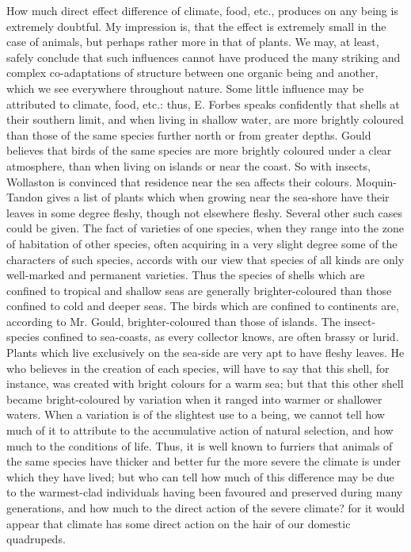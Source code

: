 How much direct effect difference of climate, food, etc., produces on any being is extremely doubtful. My impression is, that the effect is extremely small in the case of animals, but perhaps rather more in that of plants. We may, at least, safely conclude that such influences cannot have produced the many striking and complex co-adaptations of structure between one organic being and another, which we see everywhere throughout nature. Some little influence may be attributed to climate, food, etc.: thus, E. Forbes speaks confidently that shells at their southern limit, and when living in shallow water, are more brightly coloured than those of the same species further north or from greater depths. Gould believes that birds of the same species are more brightly coloured under a clear atmosphere, than when living on islands or near the coast. So with insects, Wollaston is convinced that residence near the sea affects their colours. Moquin-Tandon gives a list of plants which when growing near the sea-shore have their leaves in some degree fleshy, though not elsewhere fleshy. Several other such cases could be given.
The fact of varieties of one species, when they range into the zone of habitation of other species, often acquiring in a very slight degree some of the characters of such species, accords with our view that species of all kinds are only well-marked and permanent varieties. Thus the species of shells which are confined to tropical and shallow seas are generally brighter-coloured than those confined to cold and deeper seas. The birds which are confined to continents are, according to Mr. Gould, brighter-coloured than those of islands. The insect-species confined to sea-coasts, as every collector knows, are often brassy or lurid. Plants which live exclusively on the sea-side are very apt to have fleshy leaves. He who believes in the creation of each species, will have to say that this shell, for instance, was created with bright colours for a warm sea; but that this other shell became bright-coloured by variation when it ranged into warmer or shallower waters.
When a variation is of the slightest use to a being, we cannot tell how much of it to attribute to the accumulative action of natural selection, and how much to the conditions of life. Thus, it is well known to furriers that animals of the same species have thicker and better fur the more severe the climate is under which they have lived; but who can tell how much of this difference may be due to the warmest-clad individuals having been favoured and preserved during many generations, and how much to the direct action of the severe climate? for it would appear that climate has some direct action on the hair of our domestic quadrupeds.

